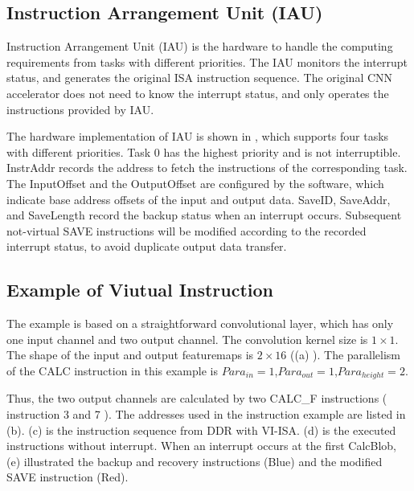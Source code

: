 \subsection{ Instruction Arrangement Unit (IAU) }

Instruction Arrangement Unit (IAU) is the hardware to handle the computing requirements from tasks with different priorities. The IAU monitors the interrupt status, and generates the original ISA instruction sequence. The original CNN accelerator does not need to know the interrupt status, and only operates the instructions provided by IAU.

The hardware implementation of IAU is shown in , which supports four tasks with different priorities. Task 0 has the highest priority and is not interruptible. 
InstrAddr records the address to fetch the instructions of the corresponding task. The InputOffset and the OutputOffset are configured by the software, which indicate base address offsets of the input and output data. 
SaveID, SaveAddr, and SaveLength record the backup status when an interrupt occurs. 
Subsequent not-virtual SAVE instructions will be modified according to the recorded interrupt status, to avoid duplicate output data transfer.


\subsection{Example of Viutual Instruction}
\label{sec:exampleVirtual}


The example is based on a straightforward convolutional layer, which has only one input channel and two output channel. 
The convolution kernel size is $1 \times 1$. The shape of the input and output featuremaps is $ 2 \times 16 $ ((a) ). The parallelism of the CALC instruction in this example is $ Para_{in} = 1$,$ Para_{out}=1$,$Para_{height}=2$.

Thus, the two output channels are calculated by two CALC\_F instructions ( instruction 3 and 7 ). The addresses used in the instruction example are listed in (b). (c) is the instruction sequence from DDR with VI-ISA. (d) is the executed instructions without interrupt. When an interrupt occurs at the first CalcBlob, (e) illustrated the backup and recovery instructions (Blue) and the modified SAVE instruction (Red).

